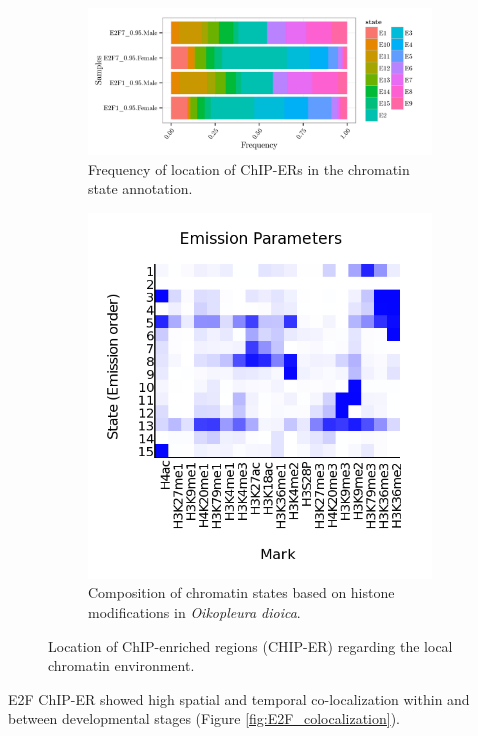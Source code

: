 \documentclass[11pt,twoside,a4paper]{report}
\begin{document}
		\begin{figure}
			\setlength{\belowcaptionskip}{5pt}
			\centering
			\begin{subfigure}[b]{1\textwidth}
				\centering
				\includegraphics[width=1\linewidth]{pngs/E2F_chromatinAnnotation.png}
				\caption{Frequency of location of ChIP-ERs in the chromatin state annotation.}
			\end{subfigure}
			\begin{subfigure}[b]{1\textwidth}
				\centering
				\includegraphics[width=0.5\linewidth]{pngs/ChromHMM_emissions_15.png}
				\caption{Composition of chromatin states based on histone modifications in \textit{Oikopleura dioica}.}
			\end{subfigure}
			\caption{Location of ChIP-enriched regions (CHIP-ER) regarding the local chromatin environment.
				{\footnotesize
				}
			}
			\label{fig:E2F_Chromatin_states}
		\end{figure}
		
		
    	E2F ChIP-ER showed high spatial and temporal co-localization within and between developmental stages (Figure \ref{fig:E2F_colocalization}).
    	
\end{document}
